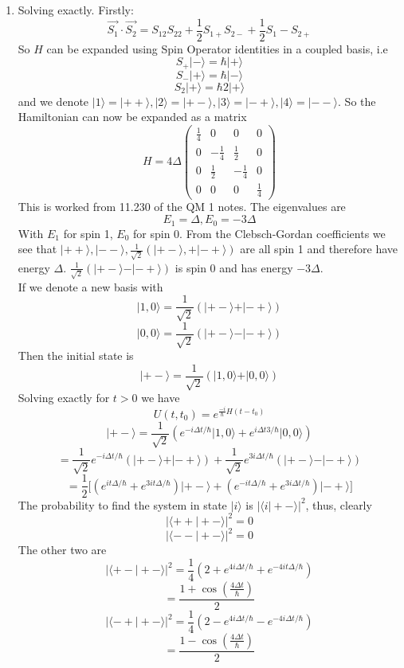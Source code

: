 \documentclass[12pt]{article}
\newcommand{\ket}[1]{\vert{#1}\rangle}
\begin{document}
\begin{enumerate}
    \item Solving exactly. Firstly: 
    $$ \vec{S_1} \cdot \vec{S_2} = S_{12} S_{22} + \frac{1}{2} S_{1+} S_{2-} + \frac{1}{2} S_1 - S_{2+} $$
    So $H$ can be expanded using Spin Operator identities in a coupled basis, i.e 
    $$ S_+ \ket{-} = \hbar \ket{+} $$
    $$ S_- \ket{+} = \hbar \ket{-} $$
    $$ S_2 \ket{+} = \hbar{2} \ket{+} $$
    and we denote $\ket{1} = \ket{++}, \ket{2} = \ket{+-}, \ket{3} = \ket{-+}, \ket{4} = \ket{--} $. So the Hamiltonian can now be expanded as a matrix 
    $$ H = 4 \Delta \begin{pmatrix}
        \frac{1}{4} & 0 & 0 & 0 \\
        0 & - \frac{1}{4} & \frac{1}{2} & 0 \\
        0 & \frac{1}{2} & - \frac{1}{4} & 0 \\
        0 & 0 & 0 & \frac{1}{4} 
    \end{pmatrix}  $$
    This is worked from 11.230 of the QM 1 notes. The eigenvalues are 
    $$ E_{1} = \Delta, E_{0} = - 3 \Delta $$ 
    With $E_1$ for spin 1, $E_0$ for spin 0. From the Clebsch-Gordan coefficients we see that $\ket{++}, \ket{--}, \frac{1}{\sqrt{2}} ( \ket{+-}, + \ket{-+} )$ are all spin 1 and therefore have energy $\Delta$. $\frac{1}{\sqrt{2}} ( \ket{+-} - \ket{-+} ) $ is spin 0 and has energy $- 3 \Delta$. \\
    If we denote a new basis with 
    $$ \ket{1,0} = \frac{1}{\sqrt{2}} ( \ket{+-} + \ket{-+} ) $$
    $$ \ket{0,0} = \frac{1}{\sqrt{2}} ( \ket{+-} - \ket{-+} ) $$
    Then the initial state is 
    $$ \ket{+-} = \frac{1}{\sqrt{2}} ( \ket{1,0} + \ket{0,0} ) $$
    Solving exactly for $t >0$ we have 
    $$ U(t, t_0) = e^{\frac{-i}{\hbar} H (t-t_0) } $$
    $$ \ket{+-} = \frac{1}{\sqrt{2}} ( e^{-i \Delta t/ \hbar} \ket{1,0} + e^{i \Delta t 3 / \hbar} \ket{0,0} ) $$
    $$ = \frac{1}{\sqrt{2}} e^{-i \Delta t / \hbar} ( \ket{+-} + \ket{-+ } ) + \frac{1}{\sqrt{2}} e^{3i \Delta t / \hbar} ( \ket{+-} - \ket{-+} ) $$
    $$ = \frac{1}{2} \Big[ (e^{it \Delta / \hbar} + e^{3it \Delta / \hbar} ) \ket{+-} + ( e^{-i t \Delta / \hbar} + e^{3i \Delta t / \hbar} ) \ket{-+} \Big] $$
    The probability to find the system in state $\ket{i}$ is $| \langle i | +- \rangle |^2$, thus, clearly 
    $$ | \langle ++ | +- \rangle |^2 =0 $$
    $$ | \langle -- | +- \rangle |^2 = 0 $$ 
    The other two are 
    $$ | \langle +- | +- \rangle |^2 = \frac{1}{4} ( 2 + e^{4i \Delta t / \hbar} + e^{-4 i t \Delta / \hbar} ) $$
    $$ = \frac{1 + \cos( \frac{4 \Delta t}{\hbar} )}{2} $$
    $$ | \langle -+ | +- \rangle |^2 = \frac{1}{4} ( 2 - e^{4i \Delta t / \hbar} - e^{-4i \Delta t / \hbar} ) $$
    $$ = \frac{1 - \cos (\frac{4 \Delta t}{\hbar}  )}{2} $$


\end{enumerate}
\end{document}
